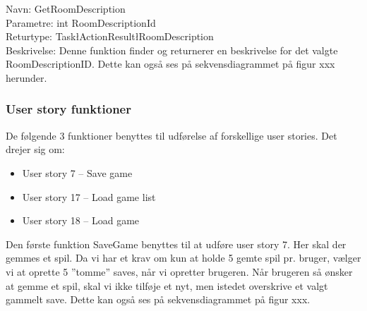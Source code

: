 Navn: GetRoomDescription \\
Parametre: int RoomDescriptionId \\
Returtype: Task\l ActionResult\l RoomDescription\g\g \\
Beskrivelse: Denne funktion finder og returnerer en beskrivelse for det valgte RoomDescriptionID. 
Dette kan også ses på sekvensdiagrammet på figur xxx herunder.


\subsubsection{User story funktioner}
De følgende 3 funktioner benyttes til udførelse af forskellige user stories.
Det drejer sig om:
\begin{itemize}
\item User story 7 – Save game
\item User story 17 – Load game list
\item User story 18 – Load game \\
\end{itemize}

Den første funktion SaveGame benyttes til at udføre user story 7.
Her skal der gemmes et spil.
Da vi har et krav om kun at holde 5 gemte spil pr. bruger, vælger vi at oprette 5 ”tomme” saves, når vi opretter brugeren.  
Når brugeren så ønsker at gemme et spil, skal vi ikke tilføje et nyt, men istedet overskrive et valgt gammelt save.
Dette kan også ses på sekvensdiagrammet på figur xxx.\\\\


